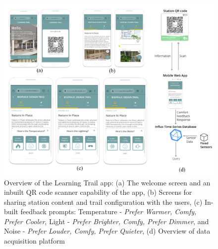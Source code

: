 \begin{figure}
\begin{center}
\includegraphics[width=\textwidth, trim= 0cm 0cm 0cm 0cm,clip]{Images/Fig2.jpg}
\caption{Overview of the Learning Trail app: (a) The welcome screen and an inbuilt QR code scanner capability of the app, (b) Screens for sharing station content and trail configuration with the users, (c) In-built feedback prompts: Temperature - \emph{Prefer Warmer, Comfy, Prefer Cooler}, Light - \emph{Prefer Brighter, Comfy, Prefer Dimmer}, and Noise - \emph{Prefer Louder, Comfy, Prefer Quieter}, (d) Overview of data acquisition platform}
\label{fig:mobileapp}
\end{center}
\end{figure}

